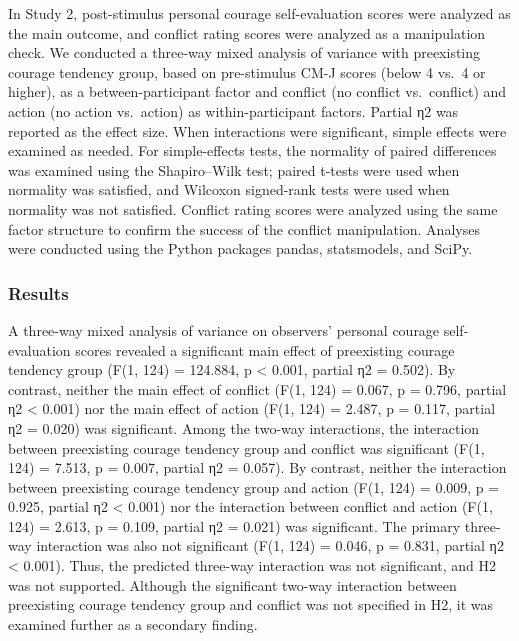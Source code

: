 In Study 2, post-stimulus personal courage self-evaluation scores were
analyzed as the main outcome, and conflict rating scores were analyzed
as a manipulation check. We conducted a three-way mixed analysis of
variance with preexisting courage tendency group, based on pre-stimulus
CM-J scores (below 4 vs.~4 or higher), as a between-participant factor
and conflict (no conflict vs.~conflict) and action (no action
vs.~action) as within-participant factors. Partial η2 was reported as
the effect size. When interactions were significant, simple effects were
examined as needed. For simple-effects tests, the normality of paired
differences was examined using the Shapiro--Wilk test; paired t-tests
were used when normality was satisfied, and Wilcoxon signed-rank tests
were used when normality was not satisfied. Conflict rating scores were
analyzed using the same factor structure to confirm the success of the
conflict manipulation. Analyses were conducted using the Python packages
pandas, statsmodels, and SciPy.

\subsubsection{Results}\label{results-1}

A three-way mixed analysis of variance on observers' personal courage
self-evaluation scores revealed a significant main effect of preexisting
courage tendency group (F(1, 124) = 124.884, p \textless{} 0.001,
partial η2 = 0.502). By contrast, neither the main effect of conflict
(F(1, 124) = 0.067, p = 0.796, partial η2 \textless{} 0.001) nor the
main effect of action (F(1, 124) = 2.487, p = 0.117, partial η2 = 0.020)
was significant. Among the two-way interactions, the interaction between
preexisting courage tendency group and conflict was significant (F(1,
124) = 7.513, p = 0.007, partial η2 = 0.057). By contrast, neither the
interaction between preexisting courage tendency group and action (F(1,
124) = 0.009, p = 0.925, partial η2 \textless{} 0.001) nor the
interaction between conflict and action (F(1, 124) = 2.613, p = 0.109,
partial η2 = 0.021) was significant. The primary three-way interaction
was also not significant (F(1, 124) = 0.046, p = 0.831, partial η2
\textless{} 0.001). Thus, the predicted three-way interaction was not
significant, and H2 was not supported. Although the significant two-way
interaction between preexisting courage tendency group and conflict was
not specified in H2, it was examined further as a secondary finding.

